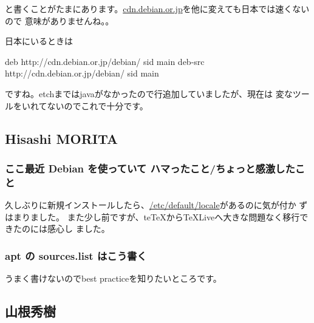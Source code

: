\documentclass[mingoth,a4paper]{jsarticle}
\begin{document}
と書くことがたまにあります。\url{cdn.debian.or.jp}を他に変えても日本では速くないので
意味がありませんね。。

日本にいるときは

\begin{commandline}
 deb http://cdn.debian.or.jp/debian/ sid main
 deb-src http://cdn.debian.or.jp/debian/ sid main
\end{commandline}

ですね。etchまではjavaがなかったので行追加していましたが、現在は
変なツールをいれてないのでこれで十分です。

\subsection{Hisashi MORITA}

\subsubsection{ここ最近 Debian を使っていて ハマったこと/ちょっと感激したこと}

久しぶりに新規インストールしたら、\url{/etc/default/locale}があるのに気が付か
ずはまりました。
また少し前ですが、teTeXからTeXLiveへ大きな問題なく移行できたのには感心し
ました。

\subsubsection{apt の sources.list はこう書く}

うまく書けないのでbest practiceを知りたいところです。

\subsection{山根秀樹}
\end{document}
